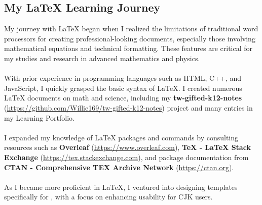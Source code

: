 \documentclass[a4paper,12pt]{./article}
\begin{document}
\subsection{My \LaTeX{} Learning Journey}
My journey with \LaTeX{} began when I realized the limitations of traditional word processors for creating professional-looking documents, especially those involving mathematical equations and technical formatting. These features are critical for my studies and research in advanced mathematics and physics.\\\\
With prior experience in programming languages such as HTML, C++, and JavaScript, I quickly grasped the basic syntax of \LaTeX. I created numerous \LaTeX{} documents on math and science, including my \textbf{tw-gifted-k12-notes} (\href{https://github.com/Willie169/tw-gifted-k12-notes}{https://github.com/Willie169/tw-gifted-k12-notes}) project and many entries in my Learning Portfolio.\\\\
I expanded my knowledge of \LaTeX{} packages and commands by consulting resources such as \textbf{Overleaf} (\href{https://www.overleaf.com}{https://www.overleaf.com}), \textbf{TeX - LaTeX Stack Exchange} (\href{https://tex.stackexchange.com}{https://tex.stackexchange.com}), and package documentation from \textbf{CTAN - Comprehensive TEX Archive Network} (\href{https://ctan.org}{https://ctan.org}).\\\\
As I became more proficient in \LaTeX, I ventured into designing templates specifically for \XeTeX, with a focus on enhancing usability for CJK users.
\end{document}
